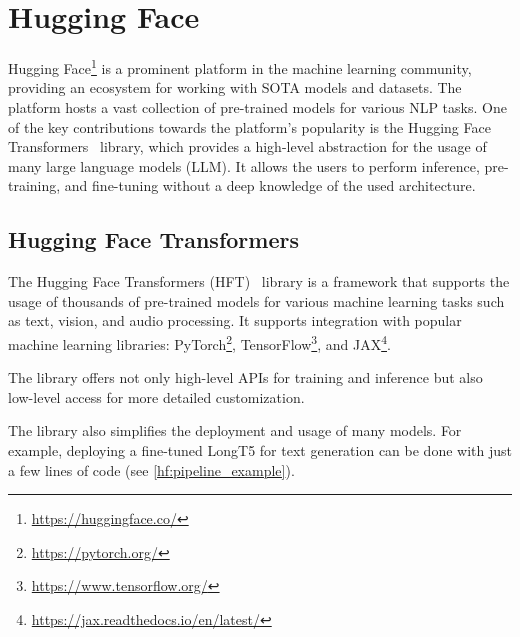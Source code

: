 \documentclass[english, ba, kiv, he, iso690numb, pdf, viewonly]{fasthesis}
\begin{document}
\section{Hugging Face} \label{hf}
Hugging Face\footnote{\url{https://huggingface.co/}} is a prominent platform in the machine learning community, providing an ecosystem for working with SOTA models and datasets. The platform hosts a vast collection of pre-trained models for various NLP tasks. One of the key contributions towards the platform's popularity is the Hugging Face Transformers~\cite{wolf-etal-2020-transformers} library, which provides a high-level abstraction for the usage of many large language models (LLM). It allows the users to perform inference, pre-training, and fine-tuning without a deep knowledge of the used architecture. 
\subsection{Hugging Face Transformers}
The Hugging Face Transformers (HFT)~\cite{wolf-etal-2020-transformers} library is a framework that supports the usage of thousands of pre-trained models for various machine learning tasks such as text, vision, and audio processing. It supports integration with popular machine learning libraries: PyTorch\footnote{\url{https://pytorch.org/}}, TensorFlow\footnote{\url{https://www.tensorflow.org/}}, and JAX\footnote{\url{https://jax.readthedocs.io/en/latest/}}.

The library offers not only high-level APIs for training and inference but also low-level access for more detailed customization.

The library also simplifies the deployment and usage of many models. For example, deploying a fine-tuned LongT5 for text generation can be done with just a few lines of code (see \ref{hf:pipeline_example}).
\end{document}

